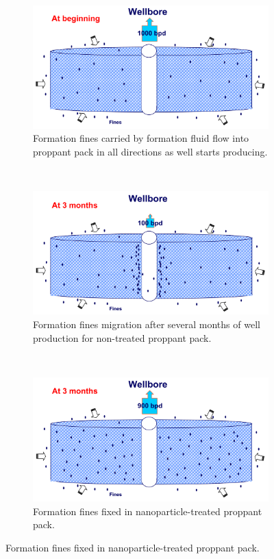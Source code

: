 \begin{figure}[p] 
    \begin{subfigure}{.8\textwidth}
    \centering
    \includegraphics[width=\textwidth]{img/fig/fines1.png}
    \caption{Formation fines carried by formation fluid flow into proppant pack in all directions as well starts producing.}
    \label{fig:fines1}
    \end{subfigure}
    \\
    \begin{subfigure}{.8\textwidth}
    \centering
    \includegraphics[width=\textwidth]{img/fig/fines2.png}
    \caption{Formation fines migration after several months of well production for non-treated proppant pack.}
    \label{fig:fines2}
    \end{subfigure}
    \\
    \begin{subfigure}{.8\textwidth}
    \centering
    \includegraphics[width=\textwidth]{img/fig/fines3.png}
    \caption{Formation fines fixed in nanoparticle-treated proppant pack.}
    \label{fig:fines3}
    \end{subfigure}
    

\end{figure}
